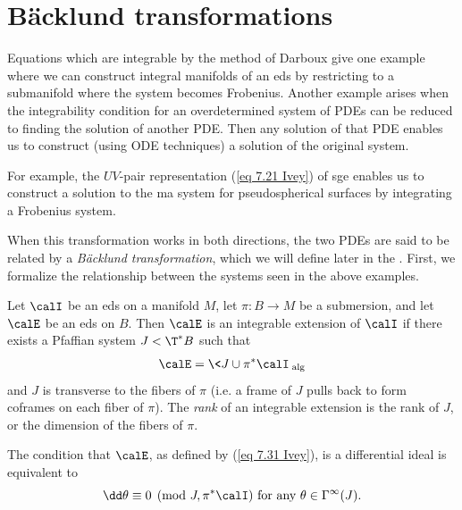 \section{B\"acklund transformations}


Equations which are integrable by the method of Darboux give one example where we can construct integral manifolds of an \gls{eds} by restricting to a submanifold where the system becomes Frobenius. Another example arises when the integrability condition for an overdetermined system of PDEs can be reduced to finding the solution of another PDE. Then any solution of that PDE enables us to construct (using ODE techniques) a solution of the original system.

\begin{example}\label{ex 7.5.1 Ivey}
    For example, the $UV$-pair representation (\ref{eq 7.21 Ivey}) of \gls{sge} enables us to construct a solution to the \gls{ma} system for pseudospherical surfaces by integrating a Frobenius system.
\end{example}

When this transformation works in both directions, the two PDEs are said to be related by a \emph{B\"acklund transformation}, which we will define later in the \sect. First, we formalize the relationship between the systems seen in the above examples.

\begin{defn}
    Let $\calI$ be an \gls{eds} on a manifold $M$, let $\pi:B\to M$ be a submersion, and let $\calE$ be an \gls{eds} on $B$. Then $\calE$ is an integrable extension of $\calI$ if there exists a Pfaffian system $J<\T^\ast B$ such that 
    \[\calE=\<J\cup \pi^\ast\calI\>_{\mathrm{alg}}\label{eq 7.31 Ivey}\]
    and $J$ is transverse to the fibers of $\pi$ (i.e. a frame of $J$ pulls back to form coframes on each fiber of $\pi$).  The \emph{rank} of an integrable extension is the rank of $J$, or the dimension of the fibers of $\pi$.
\end{defn}


The condition that $\calE$, as defined by (\ref{eq 7.31 Ivey}), is a differential ideal is equivalent to 
\[\dd\theta\equiv 0\pmod{J,\pi^\ast\calI}\text{ for any }\theta\in\Gamma^\infty(J).\label{eq 7.32 Ivey}\]


